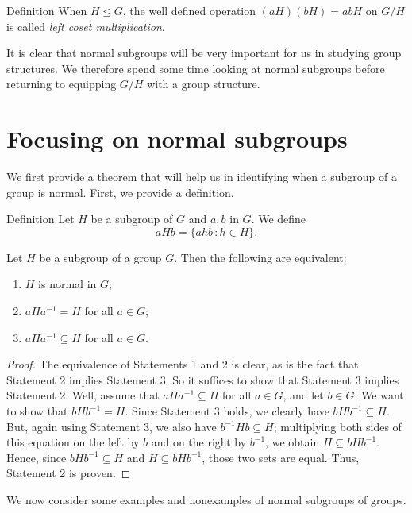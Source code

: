 \begin{df}{Definition} When $H\unlhd G$, the well defined operation
$(aH)(bH)=abH$ on $G/H$ is called \textit{left coset
multiplication}.\end{df}

  It is clear that normal subgroups will be
very important for us in studying group structures.  We therefore
spend some time looking at normal subgroups before returning to
equipping $G/H$ with a group structure.

\section{Focusing on normal subgroups}

We first provide a theorem that will help us in identifying when a
subgroup of a group is normal. First, we provide a  definition.

\begin{df}{Definition} Let $H$ be a subgroup of $G$ and $a,b$ in $G$. We define
$$aHb=\{ahb\,:h\in H\}.$$\end{df}

\begin{thm}\label{norm.thm} Let $H$ be a subgroup of a group $G$.  Then the
following are equivalent:
\begin{enumerate}
\item $H$ is normal in $G$;
\item $aHa^{-1}=H$ for all $a\in G$;
\item $aHa^{-1}\subseteq H$ for all $a\in G$.
\end{enumerate}
\end{thm}

\begin{proof} The equivalence of Statements 1 and 2 is clear, as is the
fact that Statement 2 implies Statement 3.  So it suffices to show
that Statement 3 implies Statement 2. Well, assume that
$aHa^{-1}\subseteq H$ for all $a\in G$, and let $b\in G$.  We want
to show that $bHb^{-1}=H$. Since Statement 3 holds, we clearly have
$bHb^{-1}\subseteq H$.  But, again using Statement 3, we also have
$b^{-1}Hb\subseteq H$; multiplying both sides of this equation on
the left by $b$ and on the right by $b^{-1}$, we obtain $H\subseteq
bHb^{-1}$.  Hence, since $bHb^{-1}\subseteq H$ and $H\subseteq
bHb^{-1}$, those two sets are equal. Thus, Statement 2 is proven.\end{proof}

We now consider some examples and nonexamples of normal subgroups of
groups.

